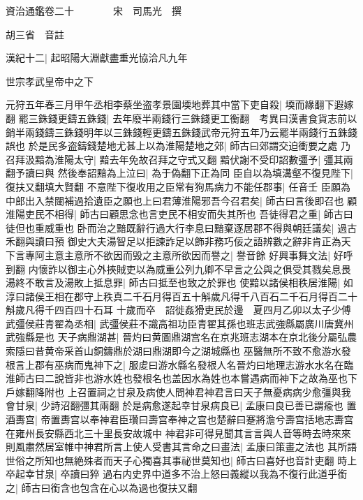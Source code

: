 資治通鑑卷二十　　　　宋　司馬光　撰

胡三省　音註

漢紀十二|{
	起昭陽大淵獻盡重光協洽凡九年}


世宗孝武皇帝中之下

元狩五年春三月甲午丞相李蔡坐盗孝景園堧地葬其中當下吏自殺|{
	堧而緣翻下遐嫁翻}
罷三銖錢更鑄五銖錢|{
	去年廢半兩錢行三銖錢更工衡翻　考異曰漢書食貨志前以銷半兩錢鑄三銖錢明年以三銖錢輕更鑄五銖錢武帝元狩五年乃云罷半兩錢行五銖錢誤也}
於是民多盗鑄錢楚地尤甚上以為淮陽楚地之郊|{
	師古曰郊謂交迫衝要之處}
乃召拜汲黯為淮陽太守|{
	黯去年免故召拜之守式又翻}
黯伏謝不受印詔數彊予|{
	彊其兩翻予讀曰與}
然後奉詔黯為上泣曰|{
	為于偽翻下正為同}
臣自以為填溝壑不復見陛下|{
	復扶又翻填大賢翻}
不意陛下復收用之臣常有狗馬病力不能任郡事|{
	任音壬}
臣願為中郎出入禁闥補過拾遺臣之願也上曰君薄淮陽邪吾今召君矣|{
	師古曰言後即召也}
顧淮陽吏民不相得|{
	師古曰顧思念也言吏民不相安而失其所也}
吾徒得君之重|{
	師古曰徒但也重威重也}
卧而治之黯既辭行過大行李息曰黯棄逐居郡不得與朝廷議矣|{
	過古禾翻與讀曰預}
御史大夫湯智足以拒諫詐足以飾非務巧佞之語辨數之辭非肯正為天下言專阿主意主意所不欲因而毁之主意所欲因而譽之|{
	譽音餘}
好興事舞文法|{
	好呼到翻}
内懷詐以御主心外挾賊吏以為威重公列九卿不早言之公與之俱受其戮矣息畏湯終不敢言及湯敗上抵息罪|{
	師古曰抵至也致之於罪也}
使黯以諸侯相秩居淮陽|{
	如淳曰諸侯王相在郡守上秩真二千石月得百五十斛歲凡得千八百石二千石月得百二十斛歲凡得千四百四十石耳}
十歲而卒　詔徙姦猾吏民於邊　夏四月乙卯以太子少傅武彊侯莊青翟為丞相|{
	武彊侯莊不識高祖功臣青翟其孫也班志武強縣屬廣川唐冀州武強縣是也}
天子病鼎湖甚|{
	晉灼曰黄圖鼎湖宫名在京兆班志湖本在京北後分屬弘農索隱曰昔黄帝采首山銅鑄鼎於湖曰鼎湖即今之湖城縣也}
巫醫無所不致不愈游水發根言上郡有巫病而鬼神下之|{
	服䖍曰游水縣名發根人名晉灼曰地理志游水水名在臨淮師古曰二說皆非也游水姓也發根名也盖因水為姓也本嘗遇病而神下之故為巫也下戶嫁翻降附也}
上召置祠之甘泉及病使人問神君神君言曰天子無憂病病少愈彊與我會甘泉|{
	少詩沼翻彊其兩翻}
於是病愈遂起幸甘泉病良已|{
	孟康曰良已善已謂瘉也}
置酒夀宫|{
	帝置夀宫以奉神君臣瓚曰壽宫奉神之宫也楚辭曰蹇將澹兮壽宫括地志夀宫在雍州長安縣西北三十里長安故城中}
神君非可得見聞其言言與人音等時去時來來則風肅然居室帷中神君所言上使人受書其言命之曰畫法|{
	孟康曰策畫之法也}
其所語世俗之所知也無絶殊者而天子心獨喜其事祕世莫知也|{
	師古曰喜好也音計吏翻}
時上卒起幸甘泉|{
	卒讀曰猝}
過右内史界中道多不治上怒曰義縱以我為不復行此道乎銜之|{
	師古曰銜含也包含在心以為過也復扶又翻}


